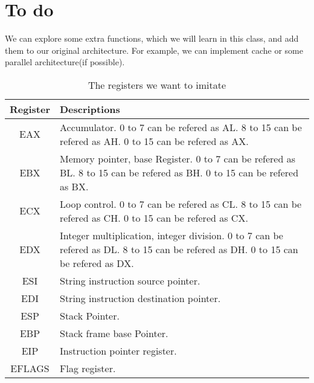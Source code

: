 \documentclass[12pt]{extarticle}
\begin{document}
        \section{To do}
        We can explore some extra functions, which we will learn in this class, and add them to our original architecture. For example, we can implement cache or some parallel architecture(if possible).
        \begin{table}[h!]
            \centering
            \begin{tabular}{||c | p{9cm}||} 
             \hline
             Register & Descriptions \\ [0.5ex] 
             \hline
             EAX & Accumulator. 0 to 7 can be refered as AL. 8 to 15 can be refered as AH. 0 to 15 can be refered as AX. \\ 
             \hline
             EBX & Memory pointer, base Register. 0 to 7 can be refered as BL. 8 to 15 can be refered as BH. 0 to 15 can be refered as BX. \\
             \hline
             ECX & Loop control. 0 to 7 can be refered as CL. 8 to 15 can be refered as CH. 0 to 15 can be refered as CX. \\
             \hline
             EDX & Integer multiplication, integer division. 0 to 7 can be refered as DL. 8 to 15 can be refered as DH. 0 to 15 can be refered as DX. \\
             \hline
             ESI & String instruction source pointer. \\
             \hline
             EDI & String instruction destination pointer. \\
             \hline
             ESP & Stack Pointer. \\
             \hline
             EBP & Stack frame base Pointer. \\
             \hline
             EIP & Instruction pointer register. \\
             \hline
             EFLAGS & Flag register. \\
             \hline
            \end{tabular}
            \caption{The registers we want to imitate}
            \label{table:1}
        \end{table}
        
\end{document}
